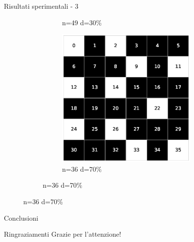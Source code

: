 \documentclass[a4paper]{beamer}
\begin{document}
\begin{frame}{Risultati sperimentali - 3}
\begin{figure}[h!]
\begin{subfigure}[b]{\textwidth}
\begin{subfigure}[b]{0.25\textwidth}
			\caption{n=49 d=30\%}
        \end{subfigure}
        \hspace{1em}
        \begin{subfigure}[b]{0.25\textwidth}
            \includegraphics[width=\columnwidth]{images/Tai36c_6x6_70.eps}
			\caption{n=36 d=70\%}
        \end{subfigure}
     \end{subfigure}
\end{figure}
\end{frame}

\begin{frame}{Conclusioni}
	
\end{frame}

\begin{frame}{Ringraziamenti}
\centering
\LARGE Grazie per l'attenzione!
\end{frame}

\begin{frame}
\maketitle
\end{frame}
\end{document}
